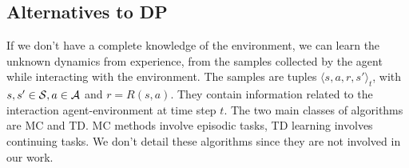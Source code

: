 \subsection{Alternatives to \ac{DP}}\label{subsec:alt}
If we don't have a complete knowledge of the environment, we can learn the unknown dynamics from experience, \ie from the samples collected by the agent while interacting with the environment. The samples are tuples $\langle s,a,r,s' \rangle_t$, with $s, s' \in \mathcal{S}, a \in \mathcal{A}$ and $r = R(s,a)$. They contain information related to the interaction agent-environment at time step $t$. The two main classes of algorithms are \acf{MC} and \acf{TD}. \ac{MC} methods involve episodic tasks, \ac{TD} learning involves continuing tasks. We don't detail these algorithms since they are not involved in our work.

